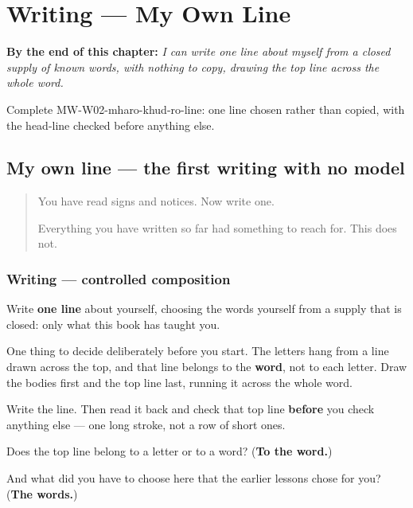 
\chapter{Writing --- My Own Line}
\label{ch:mw-khud-ro-line}

\begin{chapteropening}
\textbf{By the end of this chapter:} \emph{I can write one line about myself from a closed supply of known words, with nothing to copy, drawing the top line across the whole word.}

Complete MW-W02-mharo-khud-ro-line: one line chosen rather than copied, with the head-line checked before anything else.
\end{chapteropening}

\section[(my own line)]{My own line — the first writing with no model}

\label{lesson:MW-W02-mharo-khud-ro-line}



\begin{quote}
You have read signs and notices. Now write one.

Everything you have written so far had something to reach for. This does not.
\end{quote}

\subsection*{Writing — controlled composition}
Write \textbf{one line} about yourself, choosing the words yourself from a supply that is closed: only what this book has taught you.

One thing to decide deliberately before you start. The letters hang from a line drawn across the top, and that line belongs to the \textbf{word}, not to each letter. Draw the bodies first and the top line last, running it across the whole word.

Write the line. Then read it back and check that top line \textbf{before} you check anything else — one long stroke, not a row of short ones.

\begin{tcolorbox}[breakable,colback=teal!4,colframe=teal!35!black,title={Before you move on}]
Does the top line belong to a letter or to a word? (\textbf{To the word.})

And what did you have to choose here that the earlier lessons chose for you? (\textbf{The words.})
\end{tcolorbox}
